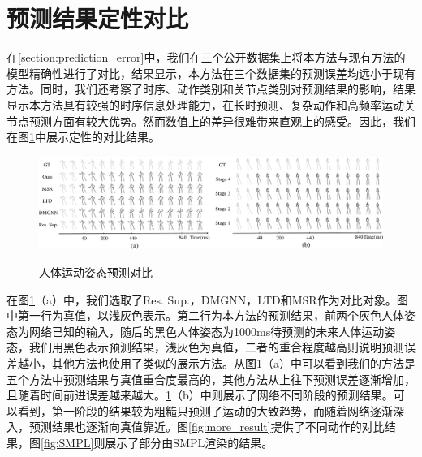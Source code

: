 \section{预测结果定性对比}
在\ref{section:prediction_error}中，我们在三个公开数据集上将本方法与现有方法的模型精确性进行了对比，结果显示，本方法在三个数据集的预测误差均远小于现有方法。同时，我们还考察了时序、动作类别和关节点类别对预测结果的影响，结果显示本方法具有较强的时序信息处理能力，在长时预测、复杂动作和高频率运动关节点预测方面有较大优势。然而数值上的差异很难带来直观上的感受。因此，我们在图\ref{fig:prediction_result}中展示定性的对比结果。

\begin{figure}[ht]
    \centering
    \includegraphics[width=1\textwidth]{FigMa/prediction_result.pdf}\\
    \vspace{-0.3cm}
    \caption{人体运动姿态预测对比}
    \label{fig:prediction_result}
\end{figure}

在图\ref{fig:prediction_result}（a）中，我们选取了Res. Sup.，DMGNN，LTD和MSR作为对比对象。图中第一行为真值，以浅灰色表示。第二行为本方法的预测结果，前两个灰色人体姿态为网络已知的输入，随后的黑色人体姿态为1000ms待预测的未来人体运动姿态，我们用黑色表示预测结果，浅灰色为真值，二者的重合程度越高则说明预测误差越小，其他方法也使用了类似的展示方法。从图\ref{fig:prediction_result}（a）中可以看到我们的方法是五个方法中预测结果与真值重合度最高的，其他方法从上往下预测误差逐渐增加，且随着时间前进误差越来越大。\ref{fig:prediction_result}（b）中则展示了网络不同阶段的预测结果。可以看到，第一阶段的结果较为粗糙只预测了运动的大致趋势，而随着网络逐渐深入，预测结果也逐渐向真值靠近。图\ref{fig:more_result}提供了不同动作的对比结果，图\ref{fig:SMPL}则展示了部分由SMPL\parencite{loper2015smpl}渲染的结果。




